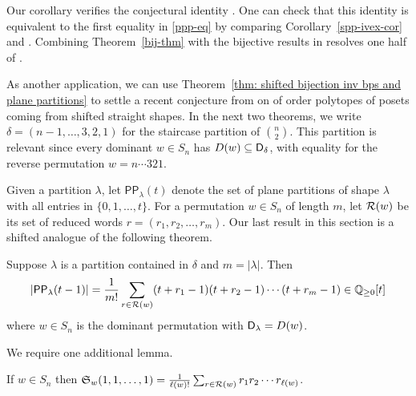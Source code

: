 \documentclass[10pt]{article}
\begin{document}
Our corollary
verifies the conjectural identity \cite[Eq.~(6.3)]{HMP6}.
One can check that this identity is equivalent to the first equality in \eqref{ppp-eq}
by comparing Corollary~\ref{spp-ivex-cor} and \cite[Cor.~6.1]{HMP6}.
Combining Theorem~\ref{bij-thm} with the bijective results in \cite{HopkinsLai}  resolves one half of \cite[Problem~6.4]{HMP6}.

As another application, we can use Theorem~\ref{thm: shifted bijection inv bps and plane partitions} to settle a recent conjecture from \cite{FMP} on  of order polytopes of posets coming from shifted straight shapes.
In the next two theorems, we write 
$ \delta = (n-1,\dots,3,2,1)$
for the staircase partition of $\binom{n}{2}$. This partition is relevant since every dominant $w \in S_n$ has $D(w) \subseteq \mathsf{D}_\delta$, with equality for the reverse permutation $w=n\cdots 321$.

Given a partition $\lambda$,
let $\mathsf{PP}_\lambda(t)$ denote the set of  plane partitions of shape $\lambda$
with all entries in $\{0,1,\dots,t\}$.
For a permutation $w \in S_n$ of length $m$, let $\mathcal{R}(w)$ be its set of reduced words $r=(r_1,r_2,\dots,r_m)$.
Our last result in this section is a shifted analogue of the following theorem.

\begin{theorem} \label{thm:FK}
		Suppose $\lambda$ is a partition contained in $\delta$ and $m=|\lambda|$.
         Then
$$|\mathsf{PP}_{\lambda}(t-1)| = \frac{1}{m!} \sum_{r \in \mathcal{R}(w)} (t+r_1-1)(t+r_2-1)\cdots (t+r_m-1)\in \mathbb{Q}_{\geq0}[t]
$$
        where $w\in S_n$ is the dominant permutation with $\mathsf{D}_\lambda= D(w)$.
\end{theorem}

We require one additional lemma.

\begin{lemma} \label{lem:macdonald positivity each v}
If $w \in S_{n}$ then $\mathfrak S_{w}(1,1,\ldots,1)=\frac{1}{\ell(w)!} \sum_{r \in \mathcal{R}(w)} r_1 r_2 \cdots r_{\ell(w)}$.
\end{lemma}

%
\end{document}
